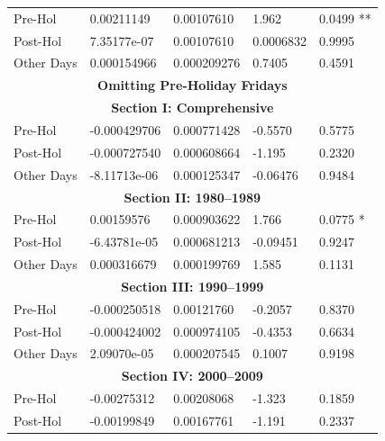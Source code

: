 \documentclass[11pt, english]{article}
\begin{document}
\begin{center}
\begin{longtable}{p{2cm}p{2cm}p{2cm}p{2cm}p{2cm}}
                \hline            
                Pre-Hol & 0.00211149 & 0.00107610 & 1.962 & 0.0499 **\\ 
                Post-Hol & 7.35177e-07 & 0.00107610 & 0.0006832 & 0.9995\\  
                Other Days & 0.000154966 & 0.000209276 & 0.7405 & 0.4591\\
                \hline
                \hline                                 
                \multicolumn{5}{c}{\textbf{Omitting Pre-Holiday Fridays}}\\         
                \hline
                \hline                                                 
                \multicolumn{5}{c}{\textbf{Section I: Comprehensive}}\\
                \hline            
                Pre-Hol & -0.000429706 & 0.000771428 & -0.5570 & 0.5775\\ 
                Post-Hol & -0.000727540 & 0.000608664 & -1.195 & 0.2320\\  
                Other Days & -8.11713e-06 & 0.000125347 & -0.06476 & 0.9484\\
                \hline                                          
                \multicolumn{5}{c}{\textbf{Section II: 1980--1989}}\\   
                \hline            
                Pre-Hol & 0.00159576 & 0.000903622 & 1.766 & 0.0775 *\\ 
                Post-Hol & -6.43781e-05 & 0.000681213 & -0.09451 & 0.9247\\  
                Other Days & 0.000316679 & 0.000199769 & 1.585 & 0.1131\\
                \hline 
                \multicolumn{5}{c}{\textbf{Section III: 1990--1999}}\\   
                \hline            
                Pre-Hol & -0.000250518 & 0.00121760 & -0.2057 & 0.8370\\ 
                Post-Hol & -0.000424002 & 0.000974105 & -0.4353 & 0.6634\\  
                Other Days & 2.09070e-05 & 0.000207545 & 0.1007 & 0.9198\\
                \hline 
                \multicolumn{5}{c}{\textbf{Section IV: 2000--2009}}\\   
                \hline                                          
                Pre-Hol & -0.00275312 & 0.00208068 & -1.323 & 0.1859\\
                Post-Hol & -0.00199849 & 0.00167761 & -1.191 & 0.2337\\  

\end{longtable}
\end{center}
\end{document}
